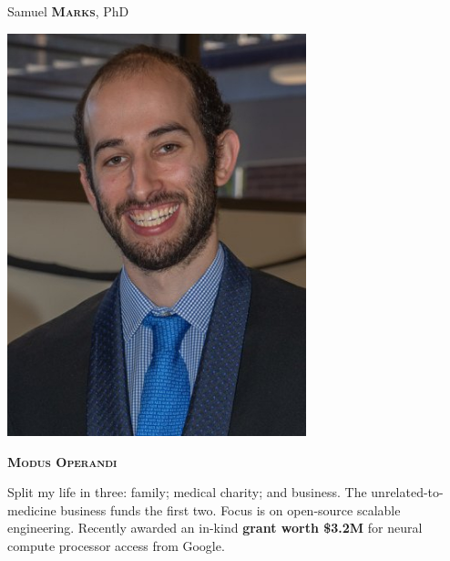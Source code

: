 \documentclass[11pt, a4paper]{article}
\newcommand{\headleft}[1]{\vspace*{3ex}\textsc{\textbf{#1}}\par%
    \vspace*{-1.5ex}\hrulefill\par\vspace*{0.7ex}}
\begin{document}
\setlength{\topskip}{0pt}
\setlength{\parindent}{0pt}
\setlength{\parskip}{0pt}
\setlength{\fboxsep}{0pt}
\pagestyle{empty}
\raggedbottom

\begin{minipage}[t]{0.33\textwidth} %
\colorbox{cvblue}{\begin{minipage}[t][5mm][t]{\textwidth}\null\hfill\null\end{minipage}}

\vspace{-.2ex} %
\colorbox{cvblue!90}{\color{white}  %
\textwidth\relax%
\begin{minipage}[t][293mm][t]{0.82\textwidth}
\raggedright
\vspace*{2.5ex}

\Large Samuel \textbf{\textsc{Marks}}, PhD \normalsize 

\null\hfill\includegraphics[width=0.65\textwidth]{user.jpg}\hfill\null

\vspace*{0.5ex} %

\headleft{Modus Operandi}
Split my life in three: family; medical charity; and business. The unrelated-to-medicine business funds the first two. Focus is on open-source scalable engineering. Recently awarded an in-kind \textbf{grant worth \$3.2M} for neural compute processor access from Google.


\end{minipage}}
\end{minipage}
\end{document}
